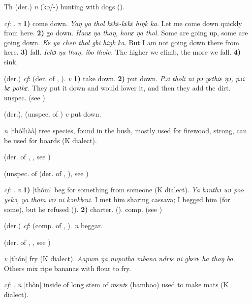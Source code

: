 \begin{letter}{Th}
 (der.) \textit{n} (kɔ/-) hunting with dogs (\citealt{Pichl1967}). 

 \textit{cf}: . \textit{v} \textbf{1)} come down. \textit{Yaŋ ya thol kɛkɛ-kɛkɛ hiŋk ka.} Let me come down quickly from here. \textbf{2)} go down. \textit{Hanɛ ŋa thaŋ, hanɛ ŋa thol.} Some are going up, some are going down. \textit{Kɛ ya chen thol gbi hiŋk ka.} But I am not going down there from here. \textbf{3)} fall. \textit{Ichɔ ŋa thaŋ, ibo thole.} The higher we climb, the more we fall. \textbf{4)} sink.

 (der.) \textit{cf}:  (der. of , ). \textit{v} \textbf{1)} take down. \textbf{2)} put down. \textit{Pɔi tholi ni pɔ yɛthiɛ ŋɔ, pɔi bɛ pothɛ.} They put it down and would lower it, and then they add the dirt. unspec.  (see )

 (der.), (unspec. of ) \textit{v} put down.

 \textit{n} [thólhàà] tree species, found in the bush, mostly used for firewood, strong, can be used for boards (K dialect). 

 (der. of , , see )

 (unspec. of  (der. of , ), see ) 

 \textit{cf}: . \textit{v} \textbf{1)} [thóm] beg for something from someone (K dialect). \textit{Ya bɔnthɔ wɔ poo yekə, ya thom wɔ ni kənklɛni.} I met him sharing cassava; I begged him (for some), but he refused (\citealt{Pichl1967}). \textbf{2)} charter. (\citealt{Pichl1967}). comp.  (see ) 

 (der.) \textit{cf}:  (comp. of , ). \textit{n} beggar.

 (der. of , , see ) 

 \textit{v} [thón] fry (K dialect). \textit{Aapum ŋa nuputha mbana ndriɛ ni gbɛrɛ ha thoŋ bo.} Others mix ripe bananas with flour to fry.

 \textit{cf}: . \textit{n} [thòn] inside of long stem of \textit{mɛntɛ} (bamboo) used to make mats (K dialect). 


\end{letter}
